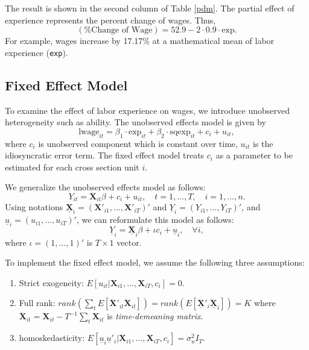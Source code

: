 \documentclass[
  12pt,
]{article}
\providecommand{\tightlist}{%
  \setlength{\itemsep}{0pt}\setlength{\parskip}{0pt}}
\begin{document}
The result is shown in the second column of Table \ref{pdm}. The partial
effect of experience represents the percent change of wages. Thus, \[
  (\text{\% Change of Wage}) = 52.9 - 2 \cdot 0.9 \cdot \text{exp}.
\] For example, wages increase by 17.17\% at a mathematical mean of
labor experience (\texttt{exp}).

\hypertarget{fixed-effect-model}{%
\subsection{Fixed Effect Model}\label{fixed-effect-model}}

To examine the effect of labor experience on wages, we introduce
unobserved heterogeneity such as ability. The unobserved effects model
is given by \[
  \text{lwage}_{it} = 
  \beta_1 \cdot \text{exp}_{it} +
  \beta_2 \cdot \text{sqexp}_{it} + 
  c_i + u_{it},
\] where \(c_i\) is unobserved component which is constant over time,
\(u_{it}\) is the idiosyncratic error term. The fixed effect model
treats \(c_i\) as a parameter to be estimated for each cross section
unit \(i\).

We generalize the unobserved effects model as follows: \[
  Y_{it} = \mathbf{X}_{it} \beta + c_i + u_{it}, \quad t = 1, \ldots, T, \quad i = 1, \ldots, n.
\] Using notations
\(\underline{\mathbf{X}}_i = (\mathbf{X}'_{i1}, \ldots, \mathbf{X}'_{iT})'\)
and \(\underline{Y}_i = (Y_{i1}, \ldots, Y_{iT})'\), and
\(\underline{u}_i = (u_{i1}, \ldots, u_{iT})'\), we can reformulate this
model as follows: \[
  \underline{Y}_i = \underline{\mathbf{X}}_i \beta + \iota c_i + \underline{u}_i, \quad \forall i,
\] where \(\iota = (1, \ldots, 1)'\) is \(T \times 1\) vector.

To implement the fixed effect model, we assume the following three
assumptions:

\begin{enumerate}
\def\labelenumi{\arabic{enumi}.}
\tightlist
\item
  Strict exogeneity:
  \(E[u_{it} | \mathbf{X}_{i1}, \ldots, \mathbf{X}_{iT}, c_i] = 0\).
\item
  Full rank:
  \(rank(\sum_t E[\ddot{\mathbf{X}}'_{it}\ddot{\mathbf{X}}_{it}]) = rank(E[\ddot{\underline{\mathbf{X}}}'_i\ddot{\underline{\mathbf{X}}}_i]) = K\)
  where
  \(\ddot{\mathbf{X}}_{it} = \mathbf{X}_{it} - T^{-1}\sum_t \mathbf{X}_{it}\)
  is \emph{time-demeaning matrix}.
\item
  homoskedasticity:
  \(E[\underline{u}_i \underline{u}'_i|\mathbf{X}_{i1}, \ldots, \mathbf{X}_{iT}, c_i] = \sigma^2_u I_T\).
\end{enumerate}
\end{document}
